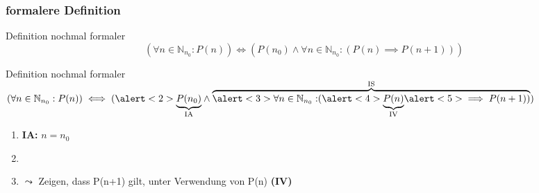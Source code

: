 \subsubsection{formalere Definition}
\begin{frame}{Definition nochmal formaler}
    \begin{equation*}
        (\forall n \in \mathbb{N}_{n_0}: P(n)) \iff (P(n_0) \wedge \forall n \in \mathbb{N}_{n_0}: (P(n) \implies P(n+1)))
    \end{equation*}    
\end{frame}

\begin{frame}{Definition nochmal formaler}
    $(\forall n \in \mathbb{N}_{n_0}: P(n)) \iff (\alert<2>{\underbrace{P(n_0)}_{\text{IA}}}\wedge \overbrace{\alert<3>{\forall n \in \mathbb{N}_{n_0}:} (\alert<4>{\underbrace{P(n)}_{\text{IV}}} \alert<5>{\implies P(n+1)})}^{\text{IS}})$
    \begin{enumerate}
        \item<2->\alert<2>{\textbf{IA:} $n = n_0$}
        \item<3->
        \item<5->\alert{$\leadsto$ Zeigen, dass P(n+1) gilt, unter Verwendung von P(n) \tiny{\textbf{(IV)}}}
    \end{enumerate}
\end{frame}



